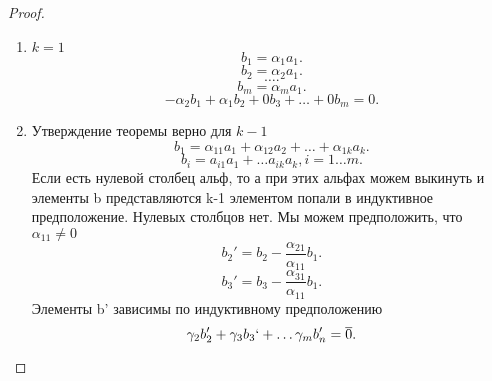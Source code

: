 \documentclass{scrartcl}
\begin{document}
     \begin{proof}
         \begin{enumerate}
             \item $k = 1$
                  \[
                 b_1 = \alpha_{1} a_{1}
                 .\] 
                 \[
                 b_2 = \alpha_{2}a_1
                 .\] 
                 \[
                 \dots
                 .\] 
                 \[
                 b_{m} = \alpha_{m} a_1
                 .\] 
                 \[
                 -\alpha_2 b_1 + \alpha_1 b_2 + 0b_3 + \dots + 0 b_{m} = 0
                 .\] 
            \item 
                Утверждение теоремы верно для $k - 1$
                 \[
                b_1 = \alpha_{11} a_1 + \alpha_{12} a_{2} + \dots + \alpha_{1k}a_{k}
                .\] 
                \[
                b_{i} = a_{i1}a_1 + \dots a_{ik}a_{k} , i = 1 \dots m
                .\] 
                Если есть нулевой столбец альф, то а при этих альфах можем выкинуть и элементы b представляются k-1 элементом попали в индуктивное предположение. Нулевых столбцов нет. Мы можем предположить, что $\alpha_{11} \neq 0$
                \[
                    b_{2}' =  b_2 - \frac{\alpha_{21}}{\alpha_{11}}b_1
                .\] 
                \[
                b_3' = b_3  - \frac{\alpha_{31}}{\alpha_{11}}b_1
                .\] 
                Элементы b' зависимы по индуктивному предположению
                \[
                \gamma_2 b_2' + \gamma_3 b_3` + \dots \gamma_{m}b_{n}' = \overline{0}
                .\] 
         \end{enumerate}
     \end{proof}
\end{document}
